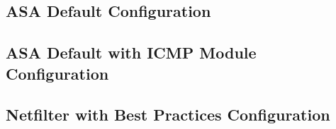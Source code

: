 \documentclass[12pt]{article}
\begin{document}


\subsection{ASA Default Configuration}
\label{appendix:ASAdefaultAppendix}




\subsection{ASA Default with ICMP Module Configuration}
\label{appendix:ASAicmpAppendix}




\subsection{Netfilter with Best Practices Configuration}
\label{appendix:netfilterBestAppendix}


\end{document}
